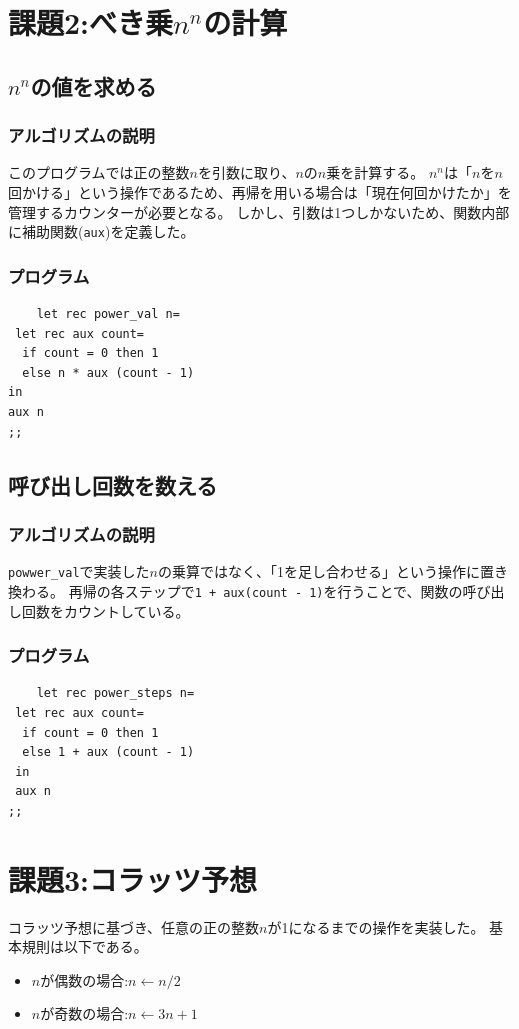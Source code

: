 \documentclass[titlepage]{ltjsarticle}
\begin{document}
\section{課題2:べき乗$n^n$の計算}
\subsection{$n^n$の値を求める}
\subsubsection{アルゴリズムの説明}
このプログラムでは正の整数$n$を引数に取り、$n$の$n$乗を計算する。
$n^n$は「$n$を$n$回かける」という操作であるため、再帰を用いる場合は「現在何回かけたか」を管理するカウンターが必要となる。
しかし、引数は1つしかないため、関数内部に補助関数(\texttt{aux})を定義した。

\subsubsection{プログラム}
\begin{verbatim}
    let rec power_val n=
 let rec aux count=
  if count = 0 then 1
  else n * aux (count - 1)
in
aux n
;;
\end{verbatim}

\subsection{呼び出し回数を数える}
\subsubsection{アルゴリズムの説明}
\texttt{powwer\_val}で実装した$n$の乗算ではなく、「1を足し合わせる」という操作に置き換わる。
再帰の各ステップで\texttt{1 + aux(count - 1)}を行うことで、関数の呼び出し回数をカウントしている。

\subsubsection{プログラム}
\begin{verbatim}
    let rec power_steps n=
 let rec aux count=
  if count = 0 then 1
  else 1 + aux (count - 1)
 in
 aux n
;;
\end{verbatim}

\section{課題3:コラッツ予想}
コラッツ予想に基づき、任意の正の整数$n$が1になるまでの操作を実装した。
基本規則は以下である。
\begin{itemize}
    \item $n$が偶数の場合:$n\leftarrow n/2$
    \item $n$が奇数の場合:$n\leftarrow 3n+1$
\end{itemize}
\end{document}
